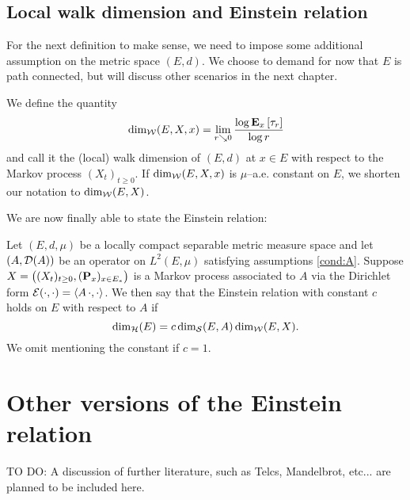 \subsection{Local walk dimension and Einstein relation}

For the next definition to make sense, we need to impose some additional assumption on the metric space $(E,d)$. We choose to demand for now that $E$ is path connected, but will discuss other scenarios in the next chapter. 
\begin{defin}
  We define the quantity
  \[
    \dimw(E,X,x)=\lim_{r\searrow0}\frac{\log \PTEp{\tau_r}{x}}{\log r}
  \]
  and call it the (local) walk dimension of $(E,d)$ at $x\in E$ with respect to the Markov process $(X_t)_{t\geq0}$. If $\dimw(E,X,x)$ is $\mu$--a.e. constant on $E$, we shorten our notation to $\dimw(E,X)$.
\end{defin}
We are now finally able to state the Einstein relation: 
\begin{defin}
  Let $(E,d,\mu)$ be a locally compact separable metric measure space and let $(A,\cD(A))$ be an operator on $L^2(E,\mu)$ satisfying assumptions \ref{cond:A}. Suppose $X=\big((X_t)_{t\geq0},(\Prob_x)_{x\in E_*}\big)$ is a Markov process associated to $A$ via the Dirichlet form $\cE(\cdot,\cdot)=\left<A\,\cdot,\cdot\right>$. We then say that the Einstein relation with constant $c$ holds on $E$ with respect to $A$ if
  \begin{equation}\label{eq:ER}
    \dimh(E)=c\dims(E,A)\dimw(E,X).
  \end{equation}
  We omit mentioning the constant if $c=1$.
\end{defin}




\section{Other versions of the Einstein relation}

TO DO: A discussion of further literature, such as Telcs, Mandelbrot, etc... are planned to be included here.

